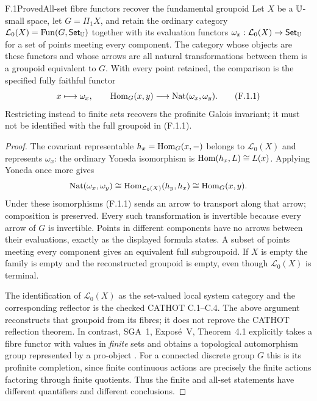 \begin{claim}{F.1}{Proved}{All-set fibre functors recover the fundamental groupoid}
Let $X$ be a $\mathbb U$-small space, let $G=\Pi_1X$, and retain the
ordinary category $\mathcal L_0(X)=\operatorname{Fun}(G,\mathsf{Set}_\mathbb U)$ together with
its evaluation functors
$\omega_x:\mathcal L_0(X)\to\mathsf{Set}_\mathbb U$ for a set of points meeting
every component.  The category whose objects are these functors and
whose arrows are all natural transformations between them is a
groupoid equivalent to $G$.  With every point retained, the
comparison is the specified fully faithful functor
\[
 x\longmapsto\omega_x,
 \qquad \operatorname{Hom}_G(x,y)\longrightarrow
             \operatorname{Nat}(\omega_x,\omega_y).            \tag{F.1.1}
\]
Restricting instead to finite sets recovers the profinite Galois
invariant; it must not be identified with the full groupoid in
(F.1.1).
\end{claim}
\begin{proof}
The covariant representable
$h_x=\operatorname{Hom}_G(x,-)$ belongs to $\mathcal L_0(X)$ and represents
$\omega_x$: the ordinary Yoneda isomorphism is
$\operatorname{Hom}(h_x,L)\cong L(x)$.  Applying Yoneda once more gives
\[
 \operatorname{Nat}(\omega_x,\omega_y)
    \cong\operatorname{Hom}_{\mathcal L_0(X)}(h_y,h_x)
    \cong\operatorname{Hom}_G(x,y).
\]
Under these isomorphisms (F.1.1) sends an arrow to transport along
that arrow; composition is preserved.  Every such transformation is
invertible because every arrow of $G$ is invertible.  Points in
different components have no arrows between their evaluations,
exactly as the displayed formula states.  A subset of points meeting
every component gives an equivalent full subgroupoid.  If $X$ is
empty the family is empty and the reconstructed groupoid is empty,
even though $\mathcal L_0(X)$ is terminal.

The identification of $\mathcal L_0(X)$ as the set-valued local
system category and the corresponding reflector is the checked
CATHOT C.1--C.4.  The above argument reconstructs that groupoid
from its fibres; it does not reprove the CATHOT reflection theorem.
In contrast, SGA~1, Expos\'e~V, Theorem~4.1 explicitly takes a fibre
functor with values in \emph{finite} sets and obtains a topological
automorphism group represented by a pro-object
\citep{EF_SGA1}.  For a connected discrete group $G$ this is its
profinite completion, since finite continuous actions are precisely
the finite actions factoring through finite quotients.  Thus the
finite and all-set statements have different quantifiers and
different conclusions.
\end{proof}

